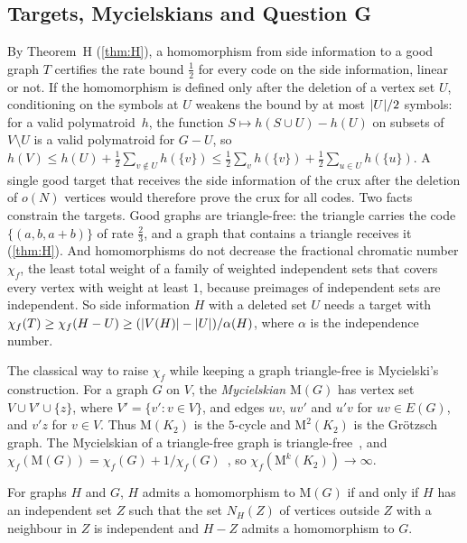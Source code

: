 \subsection{Targets, Mycielskians and Question G}\label{sec:ana-targets}

By Theorem~H (\cref{thm:H}), a homomorphism from side information to a good graph $T$ certifies the rate bound $\frac12$
for every code on the side information, linear or not. If the homomorphism is defined only after the deletion of a
vertex set $U$, conditioning on the symbols at $U$ weakens the bound by at most $\lvert U \rvert/2$ symbols: for a valid
polymatroid~$h$, the function $S\mapsto h(S\cup U)-h(U)$ on subsets of $V\setminus U$ is a valid polymatroid for $G-U$,
so $h(V)\le h(U)+\frac12\sum_{v\notin U}h(\{v\})\le\frac12\sum_vh(\{v\})+\frac12\sum_{u\in U}h(\{u\})$. A single good target
that receives the side information of the crux after the deletion of $o(N)$ vertices would therefore prove the crux for
all codes. Two facts constrain the targets. Good graphs are triangle-free: the triangle carries the code
$\{(a,b,a+b)\}$ of rate $\frac23$, and a graph that contains a triangle receives it (\cref{thm:H}). And homomorphisms do not decrease
the fractional chromatic number $\chi_f$, the least total weight of a family of weighted independent sets that covers
every vertex with weight at least $1$, because preimages of independent sets are independent. So side information $H$
with a deleted set $U$ needs a target with $\chi_f(T)\ge\chi_f(H-U)\ge(\lvert V(H) \rvert-\lvert U \rvert)/\alpha(H)$, where $\alpha$
is the independence number.

The classical way to raise $\chi_f$ while keeping a graph triangle-free is Mycielski's construction. For a graph $G$ on
$V$, the \emph{Mycielskian} $\mathrm M(G)$ has vertex set $V\cup V'\cup\{z\}$, where $V'=\{v':v\in V\}$, and edges $uv$,
$uv'$ and $u'v$ for $uv\in E(G)$, and $v'z$ for $v\in V$. Thus $\mathrm M(K_2)$ is the $5$-cycle and $\mathrm M^2(K_2)$
is the Gr\"otzsch graph. The Mycielskian of a triangle-free graph is triangle-free~\cite{Mycielski1955}, and
$\chi_f(\mathrm M(G))=\chi_f(G)+1/\chi_f(G)$~\cite{LPU1995}, so $\chi_f(\mathrm M^k(K_2))\to\infty$.

\begin{lemma}\label{lem:ana-myc}
\notformalized
For graphs $H$ and $G$, $H$ admits a homomorphism to $\mathrm M(G)$ if and only if $H$ has an independent set $Z$ such that
the set $N_H(Z)$ of vertices outside $Z$ with a neighbour in $Z$ is independent and $H-Z$ admits a homomorphism to $G$.
\end{lemma}

